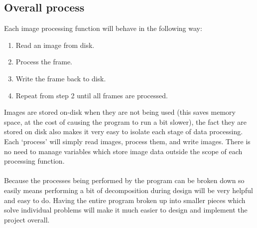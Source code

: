 \documentclass[11pt]{report}
\begin{document}
\subsection{Overall process}
Each image processing function will behave in the following way:
\begin{enumerate}
\item Read an image from disk.
\item Process the frame.
\item Write the frame back to disk.
\item Repeat from step 2 until all frames are processed.
\end{enumerate}
Images are stored on-disk when they are not being used (this saves memory space, at the cost of causing the program to run a bit slower), the fact they are stored on disk also makes it very easy to isolate each stage of data processing. Each `process' will simply read images, process them, and write images. There is no need to manage variables which store image data outside the scope of each processing function.\\\\
Because the processes being performed by the program can be broken down so easily means performing a bit of decomposition during design will be very helpful and easy to do. Having the entire program broken up into smaller pieces which solve individual problems will make it much easier to design and implement the project overall.
\end{document}
